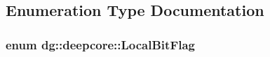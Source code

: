 \subsection{Enumeration Type Documentation}
\subsubsection[{\texorpdfstring{Local\+Bit\+Flag}{LocalBitFlag}}]{\setlength{\rightskip}{0pt plus 5cm}enum {\bf dg\+::deepcore\+::\+Local\+Bit\+Flag}\hspace{0.3cm}{\ttfamily [strong]}}\hypertarget{namespacedg_1_1deepcore_afd046fec5b746209d21544a49540a972}{}\label{namespacedg_1_1deepcore_afd046fec5b746209d21544a49540a972}

